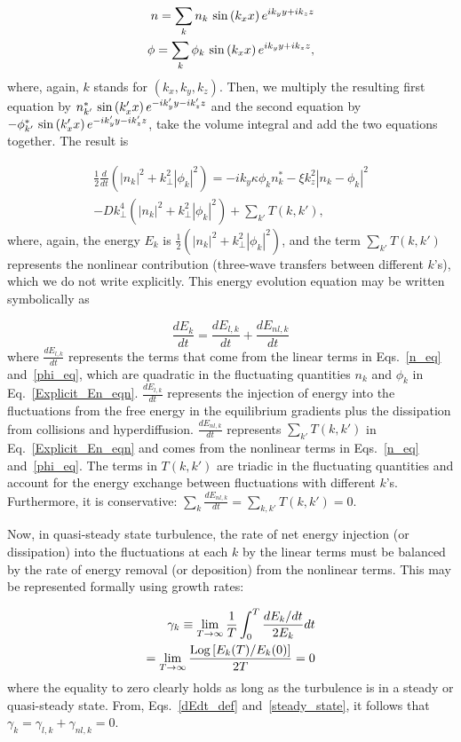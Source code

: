 \documentclass[letter,scriptaddress,twocolumn, prl,showkeys]{revtex4}
\def\beq{\begin{equation}}
\def\eeq{\end{equation}}
\def\beqar{\begin{eqnarray}}
\def\eeqar{\end{eqnarray}}
\newcommand{\diff}[2]{\frac{d#1}{d#2}}
\begin{document}
\beqar
\label{subs_fourier}
n = \sum_{k} n_k \ {\rm sin} \left( k_x x \right) e^{i k_y y + i k_z z} \\
\phi = \sum_{k} \phi_k \ {\rm sin} \left( k_x x \right) e^{i k_y y + i k_z z},
\eeqar
where, again, $k$ stands for $(k_x,k_y,k_z)$.
Then, we multiply the resulting first equation by $n^*_{k'} \ {\rm sin} \left( k'_x x \right) e^{-i k'_y y - i k'_z z}$ and the second equation by 
$-\phi^*_{k'} \ {\rm sin} \left( k'_x x \right) e^{-i k'_y y - i k'_z z}$, take the volume integral and add the two equations together. The result is

\beqar
\label{Explicit_En_eqn}
\frac{1}{2} \diff{}{t} \left( |n_k|^2 + k^2_\perp |\phi_k|^2 \right) = -i k_y \kappa \phi_k n^*_k - \xi k_z^2 |n_k - \phi_k|^2 \nonumber \\
- D k^4_\perp \left( |n_k|^2 + k^2_\perp |\phi_k|^2 \right) + \sum_{k'} T(k,k'), \quad \quad
\eeqar
where, again, the energy $E_k$ is $\frac{1}{2} \left( |n_k|^2 + k^2_\perp |\phi_k|^2 \right)$, 
and the term $\sum_{k'} T(k,k')$ represents the nonlinear contribution (three-wave transfers between different $k$'s), 
which we do not write explicitly. This energy evolution equation may be written symbolically as

\beq
\label{dEdt_def}
\diff{E_k}{t} = \diff{E_{l,k}}{t} + \diff{E_{nl,k}}{t}
\eeq
where $\diff{E_{l,k}}{t}$ represents the terms that come from the linear terms in Eqs.~\ref{n_eq} and~\ref{phi_eq}, which are quadratic in the fluctuating
quantities $n_k$ and $\phi_k$ in Eq.~\ref{Explicit_En_eqn}. 
$\diff{E_{l,k}}{t}$ represents the injection of energy into the fluctuations from the free energy in the equilibrium gradients plus the dissipation from collisions and hyperdiffusion.
$\diff{E_{nl,k}}{t}$ represents $\sum_{k'} T(k,k')$ in  Eq.~\ref{Explicit_En_eqn} and comes from the nonlinear terms in 
Eqs.~\ref{n_eq} and~\ref{phi_eq}. The terms in $T(k,k')$ are triadic in the fluctuating quantities and
account for the energy exchange between fluctuations with different $k$'s. Furthermore, it is conservative: $\sum_{k} \diff{E_{nl,k}}{t} = \sum_{k,k'} T(k,k') = 0$.

Now, in quasi-steady state turbulence, the rate of net energy injection (or dissipation) into the fluctuations at each $k$ by the linear terms must be balanced by
the rate of energy removal (or deposition) from the nonlinear terms. This may be represented formally using growth rates:

\beqar
\label{steady_state}
\gamma_k \equiv  \displaystyle\lim_{T \to \infty} \frac{1}{T} \int_0^T \frac{dE_k/dt}{2 E_k} dt \nonumber \\
= \displaystyle\lim_{T \to \infty} \frac{{\rm{Log}}\left[ E_k(T)/E_k(0) \right]}{2 T} = 0
\eeqar
where the equality to zero clearly holds as long as the turbulence is in a steady or quasi-steady state.
From, Eqs.~\ref{dEdt_def} and~\ref{steady_state}, it follows that $ \gamma_k = \gamma_{l,k} + \gamma_{nl,k} = 0$.
\end{document}
